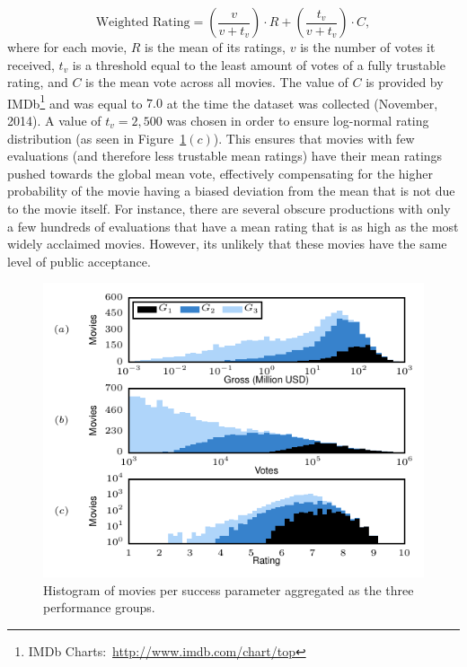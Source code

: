 \begin{equation}
\textrm{Weighted Rating} = \left(\frac{v}{v+t_v}\right) \cdot R + \left(\frac{t_v}{v+t_v}\right) \cdot C,
\label{eq:wrating}
\end{equation}
where for each movie, $R$ is the mean of its ratings, $v$ is the number of
votes it received, $t_v$ is a threshold equal to the least amount of votes of a
fully trustable rating, and $C$ is the mean vote across all movies. The value
of $C$ is provided by IMDb\footnote{IMDb
Charts:~\url{http://www.imdb.com/chart/top}} and was equal to $7.0$ at the time
the dataset was collected (November, 2014). A value of $t_v=2,500$ was chosen
in order to ensure log-normal rating distribution (as seen in
Figure~\ref{fig:hist_success}$(c)$). This ensures that movies with few
evaluations (and therefore less trustable mean ratings) have their mean ratings
pushed towards the global mean vote, effectively compensating for the higher
probability of the movie having a biased deviation from the mean that is not
due to the movie itself. For instance, there are several obscure productions
with only a few hundreds of evaluations that have a mean rating that is as high
as the most widely acclaimed movies. However, its unlikely that these movies
have the same level of public acceptance.

\begin{figure}[tb]\begin{center}
\includegraphics[width=0.85\columnwidth]{../../images/hist_success.pdf}
\caption{\label{fig:hist_success}Histogram of movies per success parameter
aggregated as the three performance groups.}
\end{center}\end{figure}

